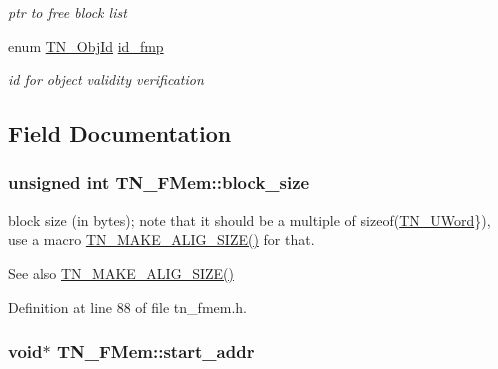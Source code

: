 \begin{DoxyCompactItemize}
\begin{DoxyCompactList}\small\item\em ptr to free block list \end{DoxyCompactList}\item 
\hypertarget{structTN__FMem_aee1235a605f90d80ec16547ea647eaff}{enum \hyperlink{tn__common_8h_ae779dd1f6735f6e139fb70acd004d976}{T\+N\+\_\+\+Obj\+Id} \hyperlink{structTN__FMem_aee1235a605f90d80ec16547ea647eaff}{id\+\_\+fmp}}\label{structTN__FMem_aee1235a605f90d80ec16547ea647eaff}

\begin{DoxyCompactList}\small\item\em id for object validity verification \end{DoxyCompactList}\end{DoxyCompactItemize}


\subsection{Field Documentation}
\hypertarget{structTN__FMem_a101e3e0eeb2774309a55ed1d6cad8e3f}{
\subsubsection[{block\+\_\+size}]{\setlength{\rightskip}{0pt plus 5cm}unsigned int T\+N\+\_\+\+F\+Mem\+::block\+\_\+size}}\label{structTN__FMem_a101e3e0eeb2774309a55ed1d6cad8e3f}


block size (in bytes); note that it should be a multiple of {\ttfamily sizeof(\hyperlink{tn__arch__example_8h_ab80cba0fe9ffcd9011d53dfeb9e39bf4}{T\+N\+\_\+\+U\+Word}\})}, use a macro {\ttfamily \hyperlink{tn__common_8h_a3f48380e8a624edc643319a81192d88e}{T\+N\+\_\+\+M\+A\+K\+E\+\_\+\+A\+L\+I\+G\+\_\+\+S\+I\+Z\+E()}} for that. 

\begin{DoxySeeAlso}{See also}
{\ttfamily \hyperlink{tn__common_8h_a3f48380e8a624edc643319a81192d88e}{T\+N\+\_\+\+M\+A\+K\+E\+\_\+\+A\+L\+I\+G\+\_\+\+S\+I\+Z\+E()}} 
\end{DoxySeeAlso}


Definition at line 88 of file tn\+\_\+fmem.\+h.

\hypertarget{structTN__FMem_a7eac768da37c99efd90ae56ebde527cf}{
\subsubsection[{start\+\_\+addr}]{\setlength{\rightskip}{0pt plus 5cm}void$\ast$ T\+N\+\_\+\+F\+Mem\+::start\+\_\+addr}}\label{structTN__FMem_a7eac768da37c99efd90ae56ebde527cf}


